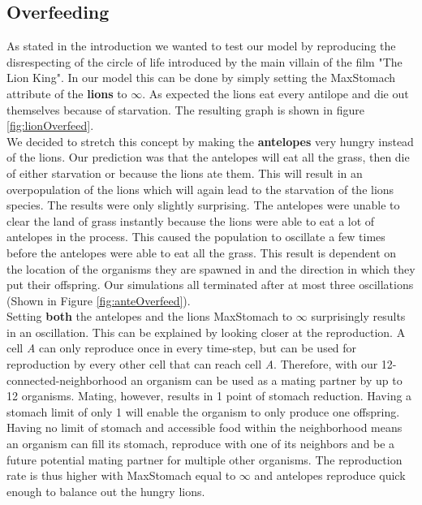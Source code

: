 \documentclass[11pt]{article}
\begin{document}
\subsection{Overfeeding}
As stated in the introduction we wanted to test our model by reproducing the disrespecting of the circle of life introduced by the main villain of the film "The Lion King". In our model this can be done by simply setting the MaxStomach attribute of the {\bf lions} to $\infty$. As expected the lions eat every antilope and die out themselves because of starvation. The resulting graph is shown in figure \ref{fig:lionOverfeed}. \\
We decided to stretch this concept by making the {\bf antelopes} very hungry instead of the lions. Our prediction was that the antelopes will eat all the grass, then die of either starvation or because the lions ate them. This will result in an overpopulation of the lions which will again lead to the starvation of the lions species. The results were only slightly surprising. The antelopes were unable to clear the land of grass instantly because the lions were able to eat a lot of antelopes in the process. This caused the population to oscillate a few times before the antelopes were able to eat all the grass. This result is dependent on the location of the organisms they are spawned in and the direction in which they put their offspring.  Our simulations all terminated after at most three oscillations (Shown in Figure \ref{fig:anteOverfeed}).\\
Setting {\bf both} the antelopes and the lions MaxStomach to $\infty$ surprisingly results in an oscillation. This can be explained by looking closer at the reproduction. A cell {\it A} can only reproduce once in every time-step, but can be used for reproduction by every other cell that can reach cell {\it A}. Therefore, with our 12-connected-neighborhood an organism can be used as a mating partner by up to 12 organisms. Mating, however, results in 1 point of stomach reduction. Having a stomach limit of only 1 will enable the organism to only produce one offspring. Having no limit of stomach and accessible food within the neighborhood means an organism can fill its stomach, reproduce with one of its neighbors and be a future potential mating partner for multiple other organisms. The reproduction rate is thus higher with MaxStomach equal to $\infty$ and antelopes reproduce quick enough to balance out the hungry lions.
\end{document}
